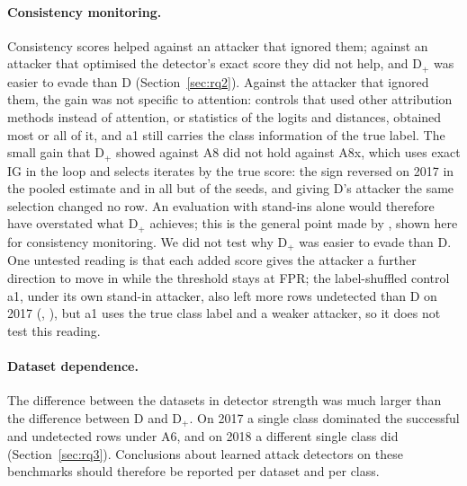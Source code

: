 \paragraph{Consistency monitoring.}
Consistency scores helped against an attacker that ignored them; against an attacker that optimised the detector's
exact score they did not help, and D$_+$ was easier to evade than D (Section~\ref{sec:rq2}).
Against the attacker that ignored them, the gain was not specific to attention: controls that used other attribution
methods instead of attention, or statistics of the logits and distances, obtained most or all of it, and a1 still
carries the class information of the true label.
The small gain that D$_+$ showed against A8 did not hold against A8x, which uses exact IG in the loop and selects
iterates by the true score: the sign reversed on 2017 in the pooled estimate and in all but \axHeadOppSeedsSeventeen{} of the \nSeeds{} seeds,
and giving D's attacker the same
selection changed no row.
An evaluation with stand-ins alone would therefore have overstated what D$_+$ achieves; this is the general point made by
\cite{tramer2020}, shown here for consistency monitoring.
We did not test why D$_+$ was easier to evade than D.
One untested reading is that each added score gives the attacker a further direction to move in while the threshold
stays at \paramFPR{} FPR; the label-shuffled control a1, under its own stand-in attacker, also left more rows
undetected than D on 2017 (\cmdAoneVoneSeventeen, \cmdAoneVoneSeventeenCI), but a1 uses the true class label and a
weaker attacker, so it does not test this reading.

\paragraph{Dataset dependence.}
The difference between the datasets in detector strength was much larger than the difference between D and D$_+$.
On 2017 a single class dominated the successful and undetected rows under A6, and on 2018 a different single class did
(Section~\ref{sec:rq3}).
Conclusions about learned attack detectors on these benchmarks should therefore be reported per dataset and per class.

